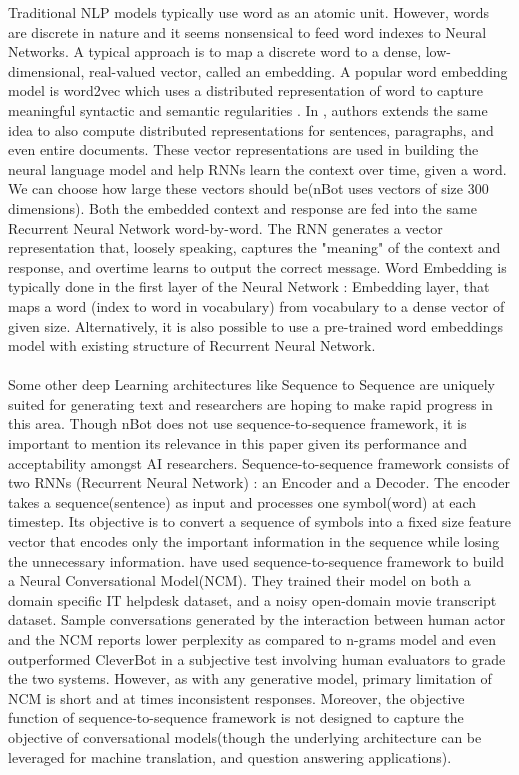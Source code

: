 \documentclass[letterpaper] {article} %
\begin{document}
Traditional NLP models typically use word as an atomic unit. However, words are discrete in nature and it seems nonsensical to feed word indexes to Neural Networks. A typical approach is to map a discrete word to a dense, low-dimensional, real-valued vector, called an embedding. A popular word embedding model is word2vec which uses a distributed representation of word to capture meaningful syntactic and semantic regularities \cite{mikolov2013efficient} \cite{mikolov2013distributed} \cite{mikolov2013linguistic}. In \cite{le2014distributed}, authors  extends the same idea to also compute distributed representations for sentences, paragraphs, and even entire documents. These vector representations are used in building the neural language model and help RNNs learn the context over time, given a word. We can choose how large these vectors should be(nBot uses vectors of size 300 dimensions). Both the embedded context and response are fed into the same Recurrent Neural Network word-by-word. The RNN generates a vector representation that, loosely speaking, captures the "meaning" of the context and response, and overtime learns to output the correct message. Word Embedding is typically done in the first layer of the Neural Network : Embedding layer, that maps a word (index to word in vocabulary) from vocabulary to a dense vector of given size. Alternatively, it is also possible to use a pre-trained word embeddings model with existing structure of Recurrent Neural Network.
\\\\
Some other deep Learning architectures like Sequence to Sequence\cite{sutskever2014sequence} are uniquely suited for generating text and researchers are hoping to make rapid progress in this area. Though nBot does not use sequence-to-sequence framework, it is important to mention its relevance in this paper given its performance and acceptability amongst AI researchers. Sequence-to-sequence framework consists of two RNNs (Recurrent Neural Network) : an Encoder and a Decoder. The encoder takes a sequence(sentence) as input and processes one symbol(word) at each timestep. Its objective is to convert a sequence of symbols into a fixed size feature vector that encodes only the important information in the sequence while losing the unnecessary information. \cite{vinyals2015neural} have used sequence-to-sequence framework to build a Neural Conversational Model(NCM). They trained their model on both a domain specific IT helpdesk dataset, and  a noisy open-domain movie transcript dataset. Sample conversations generated by the interaction between human actor and the NCM reports lower perplexity as compared to n-grams model and even outperformed CleverBot in a subjective test involving human evaluators to grade the two systems. However, as with any generative model, primary limitation of NCM is short and at times inconsistent responses. Moreover, the objective function of sequence-to-sequence framework is not designed to capture the objective of conversational models(though the underlying architecture can be leveraged for machine translation, and question answering applications).
\end{document}
